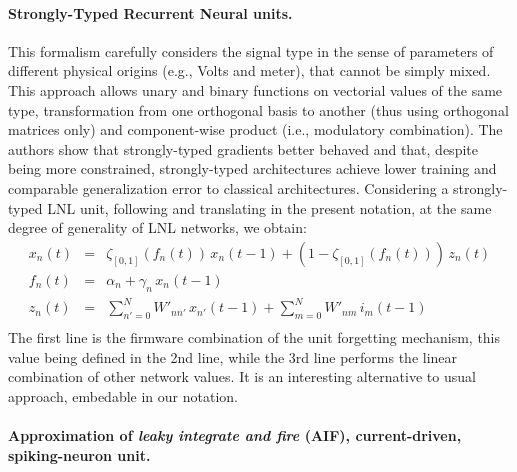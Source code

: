 \paragraph{Strongly-Typed Recurrent Neural units.} 

This formalism \cite{Balduzzi:2016} carefully considers the signal type in the sense of parameters of different physical origins (e.g., Volts and meter), that cannot be simply mixed. This approach allows unary and binary functions on vectorial values of the same type, transformation from one orthogonal basis to another (thus using orthogonal matrices only) and component-wise product (i.e., modulatory combination). The authors show that strongly-typed gradients better behaved and that, despite being more constrained, strongly-typed architectures achieve lower training and comparable
generalization error to classical architectures. Considering a strongly-typed LNL unit, following \cite{Balduzzi:2016} and translating in the present notation, at the same degree of generality of LNL networks, we obtain:
\begin{equation}\label{st-lnl-network}\begin{array}{rcll}
  x_n(t) &=& \zeta_{[0,1]}\left(f_n(t)\right) \, x_n(t-1) + \left(1 - \zeta_{[0,1]}\left(f_n(t)\right)\right) \, z_n(t) \\
  f_n(t) &=& \alpha_n + \gamma_n \,  x_n(t-1) \\
  z_n(t) &=& \sum_{n' = 0}^{N} W'_{nn'} \, x_{n'}(t-1) + \sum_{m = 0}^{N} W'_{nm} \, i_m(t-1) \\
\end{array}\end{equation}
The first line is the firmware combination of the unit forgetting mechanism, this value being defined in the 2nd line, while the 3rd line performs the linear combination of other network values.
It is an interesting alternative to usual approach, embedable in our notation.

\paragraph{Approximation of {\em leaky integrate and fire} (AIF), current-driven, spiking-neuron unit.}

